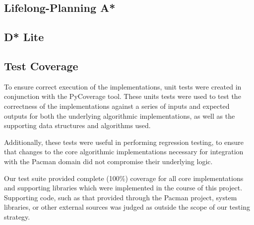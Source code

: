 \subsection{Lifelong-Planning A*}

	

\subsection{D* Lite}


\subsection{Test Coverage}

	To ensure correct execution of the implementations, unit tests were created in conjunction with the PyCoverage tool. These units tests were used to test the correctness of the implementations against a series of inputs and expected outputs for both the underlying algorithmic implementations, as well as the supporting data structures and algorithms used.
	
	Additionally, these tests were useful in performing regression testing, to ensure that changes to the core algorithmic implementations necessary for integration with the Pacman domain did not compromise their underlying logic.
	
	Our test suite provided complete (100\%) coverage for all core implementations and supporting libraries which were implemented in the course of this project. Supporting code, such as that provided through the Pacman project, system libraries, or other external sources was judged as outside the scope of our testing strategy.


